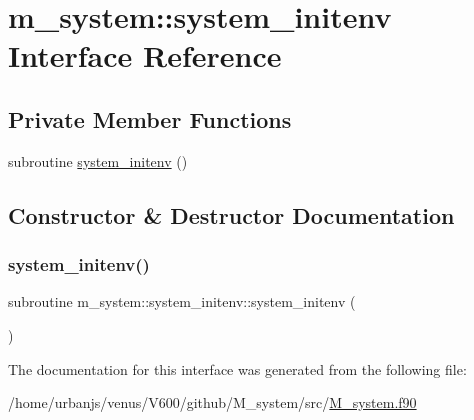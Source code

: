 \hypertarget{interfacem__system_1_1system__initenv}{}\section{m\+\_\+system\+:\+:system\+\_\+initenv Interface Reference}
\label{interfacem__system_1_1system__initenv}
\subsection*{Private Member Functions}
\begin{DoxyCompactItemize}
\item 
subroutine \mbox{\hyperlink{interfacem__system_1_1system__initenv_ae9625871bb13fdbc88fbd1dc854a45d6}{system\+\_\+initenv}} ()
\end{DoxyCompactItemize}


\subsection{Constructor \& Destructor Documentation}
\mbox{\label{interfacem__system_1_1system__initenv_ae9625871bb13fdbc88fbd1dc854a45d6}} 
\subsubsection{\texorpdfstring{system\+\_\+initenv()}{system\_initenv()}}
{\footnotesize\ttfamily subroutine m\+\_\+system\+::system\+\_\+initenv\+::system\+\_\+initenv (\begin{DoxyParamCaption}{ }\end{DoxyParamCaption})\hspace{0.3cm}{\ttfamily [private]}}



The documentation for this interface was generated from the following file\+:\begin{DoxyCompactItemize}
\item 
/home/urbanjs/venus/\+V600/github/\+M\+\_\+system/src/\mbox{\hyperlink{M__system_8f90}{M\+\_\+system.\+f90}}\end{DoxyCompactItemize}
